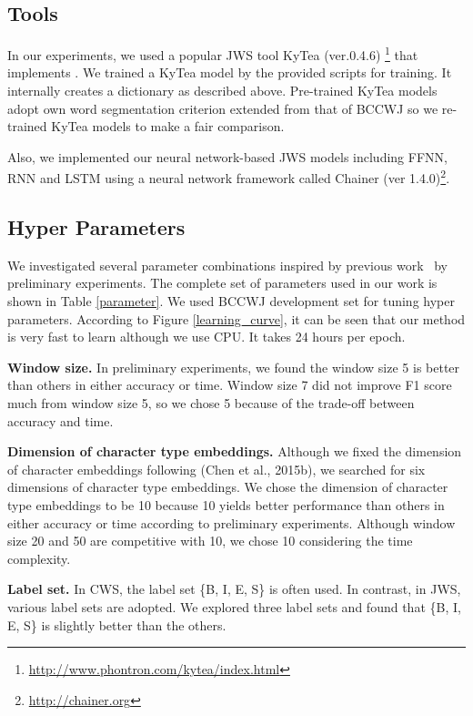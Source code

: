 \documentclass[11pt,letterpaper]{article}
\begin{document}
\subsection{Tools}
In our experiments, we used a popular JWS tool KyTea (ver.0.4.6) \footnote{\url{http://www.phontron.com/kytea/index.html}} that implements \cite{neubig-nakata-mori:2011:ACL-HLT2011}. We trained a KyTea model by the provided scripts for training. It internally creates a dictionary as described above. Pre-trained KyTea models adopt own word segmentation criterion extended from that of BCCWJ so we re-trained KyTea models to make a fair comparison.

Also, we implemented our neural network-based JWS models including FFNN, RNN and LSTM using a neural network framework called Chainer (ver 1.4.0)\footnote{\url{http://chainer.org}}\cite{chainerlearningsys2015}. 

\subsection{Hyper Parameters}
We investigated several parameter combinations inspired by previous work~\cite{chen-EtAl:2015:EMNLP2} by preliminary experiments. The complete set of parameters used in our work is shown in Table \ref{parameter}. We used BCCWJ development set for tuning hyper parameters. According to Figure \ref{learning_curve}, it can be seen that our method is very fast to learn although we use CPU. It takes 24 hours per epoch. 

\noindent
{\bf Window size.} In preliminary experiments, we found the window size 5 is better than others in  either accuracy or time. Window size 7 did not improve F1 score much from window size 5, so we chose 5  because of the trade-off between accuracy and time.

\noindent
{\bf Dimension of character type embeddings.} Although we fixed the dimension of character embeddings following (Chen et al., 2015b), we searched for six dimensions of character type embeddings. 
We chose the dimension of character type embeddings to be 10 because 10 yields better performance than others in either accuracy or time according to preliminary experiments. Although window size 20 and 50 are competitive with 10, we chose 10 considering the time complexity.

\noindent
{\bf Label set.}  In CWS, the label set \{B, I, E, S\} is often used. In contrast, in JWS, various label sets are adopted. We explored three label sets and found that \{B, I, E, S\} is slightly better than the others.
\end{document}

